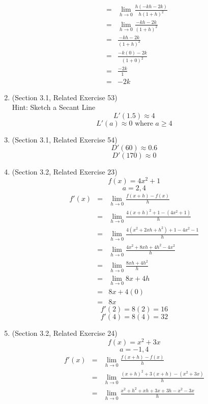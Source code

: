 \documentclass{article}
\begin{document}
\begin{enumerate}
\begin{eqnarray}
                                                &=& \lim_{h \to 0}{\frac{h(- kh - 2k)}{h(1 + h)^2}} \\
                                                &=& \lim_{h \to 0}{\frac{- kh - 2k}{(1 + h)^2}} \\
                                                &=& \frac{- kh - 2k}{(1 + h)^2} \\
                                                &=& \frac{- k(0) - 2k}{(1 + 0)^2} \\
                                                &=& \frac{- 2k}{1} \\
                                                &=& - 2k
    \end{eqnarray}
    \item (Section 3.1, Related Exercise 53)
        \\ Hint: Sketch a Secant Line
        $$L'(1.5) \approx 4$$
        $$L'(a) \approx 0 \text{ where } a \geq 4$$
    \item (Section 3.1, Related Exercise 54)
        $$D'(60) \approx 0.6$$
        $$D'(170) \approx 0$$
    \item (Section 3.2, Related Exercise 23)
    $$f(x) = 4x^2 + 1$$
    $$a = 2, 4$$
    \begin{eqnarray}
        f'(x) &=& \lim_{h \to 0}{\frac{f(x + h) - f(x)}{h}} \\
              &=& \lim_{h \to 0}{\frac{4(x + h)^2 + 1 - (4x^2 + 1)}{h}} \\
              &=& \lim_{h \to 0}{\frac{4(x^2 + 2xh + h^2) + 1 - 4x^2 - 1}{h}} \\
              &=& \lim_{h \to 0}{\frac{4x^2 + 8xh + 4h^2 - 4x^2}{h}} \\
              &=& \lim_{h \to 0}{\frac{8xh + 4h^2}{h}} \\
              &=& \lim_{h \to 0}{8x + 4h} \\
              &=& 8x + 4(0) \\
              &=& 8x
    \end{eqnarray}
    $$f'(2) = 8(2) = 16$$
    $$f'(4) = 8(4) = 32$$
    \item (Section 3.2, Related Exercise 24)
    $$f(x) = x^2 + 3x$$
    $$a = -1, 4$$
    \begin{eqnarray}
        f'(x) &=& \lim_{h \to 0}{\frac{f(x + h) - f(x)}{h}} \\
        &=& \lim_{h \to 0}{\frac{(x + h)^2 + 3(x + h) - (x^2 + 3x)}{h}} \\
        &=& \lim_{h \to 0}{\frac{x^2 + h^2 + xh + 3x + 3h - x^2 - 3x}{h}} \\

\end{eqnarray}
\end{enumerate}
\end{document}
